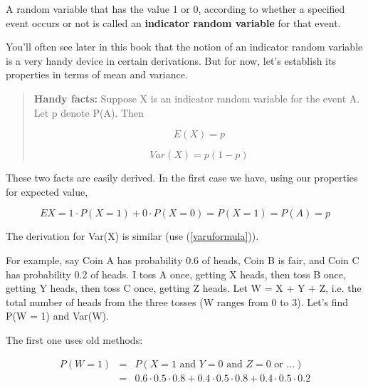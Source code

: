\begin{definition}

A random variable that has the value 1 or 0, according to whether a
specified event occurs or not is called an {\bf indicator random
variable} for that event.  

\end{definition}

You'll often see later in this book that the notion of an indicator
random variable is a very handy device in certain derivations.  But for
now, let's establish its properties in terms of mean and variance.

\begin{quote}

{\bf Handy facts:}  Suppose X is an indicator random variable for the
event A.  Let p denote P(A).  Then 

\begin{equation}
\label{eofxeqp}
E(X) = p
\end{equation}

\begin{equation}
\label{varofeqp1p}
Var(X) = p(1-p)
\end{equation}

\end{quote}

These two facts are easily derived.  In the first case we have, using our
properties for expected value,

\begin{equation}
EX = 1 \cdot P(X = 1) + 0 \cdot P(X = 0) = P(X = 1) = P(A) = p
\end{equation}

The derivation for Var(X) is similar (use (\ref{varuformula})).

For example, say Coin A has probability 0.6 of heads, Coin B is fair, and
Coin C has probability 0.2 of heads.  I toss A once, getting X heads,
then toss B once, getting Y heads, then toss C once, getting Z heads.
Let W = X + Y + Z, i.e. the total number of heads from the three tosses
(W ranges from 0 to 3).  Let's find P(W = 1) and Var(W).

The first one uses old methods:

\begin{eqnarray}
P(W = 1) &=&
   P(X = 1 \textrm{ and }  Y = 0 \textrm{ and }  Z = 0 \textrm{ or }  ...) \\
   &=& 0.6 \cdot 0.5 \cdot 0.8 +
       0.4 \cdot 0.5 \cdot 0.8 +
       0.4 \cdot 0.5 \cdot 0.2
\end{eqnarray}

